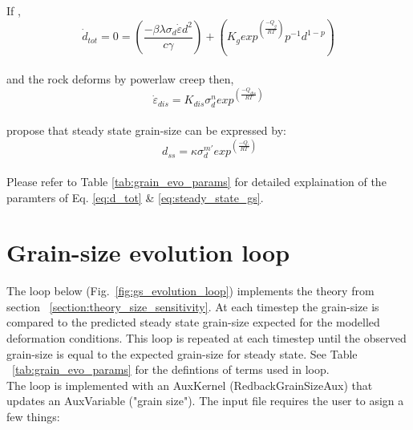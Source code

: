 \documentclass[]{scrreprt}
\begin{document}
If , \: 
\begin{equation}
 \label{eq:d_tot_0}
\dot{d}_{tot} = 0 = \left(\frac{-\beta\lambda\sigma_{d}\dot{\varepsilon}d^2}{c\gamma}\right) + \left(K_g exp^{\left(\frac{-Q_g}{RT}\right)} p^{-1} d^{1-p}\right)
\end{equation}\\

and the rock deforms by powerlaw creep then, \:
\begin{equation}
 \label{eq:dislocation_creep}
\dot{\varepsilon}_{dis} = K_{dis} \sigma_d^n exp^{\left(\frac{-Q_{dis}}{RT}\right)}
\end{equation}\\

\citet{Austin2007} propose that steady state grain-size can be expressed by: \:
\begin{equation}
 \label{eq:steady_state_gs}
\ d_{ss} = \kappa \sigma_d^{m'} exp^{\left(\frac{-Q_{'}}{RT}\right)}
\end{equation}\\

Please refer to Table \ref{tab:grain_evo_params} for detailed explaination of the paramters of Eq. \ref{eq:d_tot} \& \ref{eq:steady_state_gs}.\\


\section{Grain-size evolution loop}
\label{section:gs_evolution_loop}
The loop below (Fig.~\ref{fig:gs_evolution_loop}) implements the theory from section ~\ref{section:theory_size_sensitivity}. At each timestep the grain-size is compared to the predicted steady state grain-size expected for the modelled deformation conditions. This loop is repeated at each timestep until the observed grain-size is equal to the expected grain-size for steady state. See Table ~\ref{tab:grain_evo_params} for the defintions of terms used in loop.\\

The loop is implemented with an AuxKernel (RedbackGrainSizeAux) that updates an AuxVariable ("grain size"). The input file requires the user to asign a few things:\\
\end{document}
